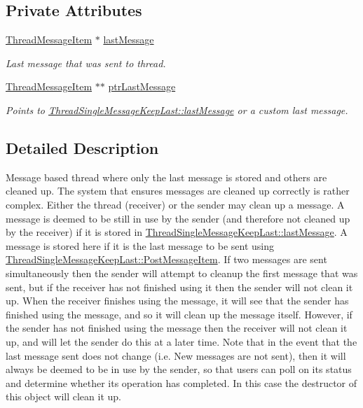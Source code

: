 \subsection*{Private Attributes}
\begin{DoxyCompactItemize}
\item 
\hyperlink{class_thread_message_item}{ThreadMessageItem} $\ast$ \hyperlink{class_thread_single_message_keep_last_ae36c3229c8538b56a7fc4740a5d58d4f}{lastMessage}
\begin{DoxyCompactList}\small\item\em Last message that was sent to thread. \item\end{DoxyCompactList}\item 
\hyperlink{class_thread_message_item}{ThreadMessageItem} $\ast$$\ast$ \hyperlink{class_thread_single_message_keep_last_a5a6db5f1ddd6002413c1424d87ff2152}{ptrLastMessage}
\begin{DoxyCompactList}\small\item\em Points to \hyperlink{class_thread_single_message_keep_last_ae36c3229c8538b56a7fc4740a5d58d4f}{ThreadSingleMessageKeepLast::lastMessage} or a custom last message. \item\end{DoxyCompactList}\end{DoxyCompactItemize}


\subsection{Detailed Description}
Message based thread where only the last message is stored and others are cleaned up. The system that ensures messages are cleaned up correctly is rather complex. Either the thread (receiver) or the sender may clean up a message. A message is deemed to be still in use by the sender (and therefore not cleaned up by the receiver) if it is stored in \hyperlink{class_thread_single_message_keep_last_ae36c3229c8538b56a7fc4740a5d58d4f}{ThreadSingleMessageKeepLast::lastMessage}. A message is stored here if it is the last message to be sent using \hyperlink{class_thread_single_message_keep_last_a27f81a79a325c68fb5257875e074924c}{ThreadSingleMessageKeepLast::PostMessageItem}. If two messages are sent simultaneously then the sender will attempt to cleanup the first message that was sent, but if the receiver has not finished using it then the sender will not clean it up. When the receiver finishes using the message, it will see that the sender has finished using the message, and so it will clean up the message itself. However, if the sender has not finished using the message then the receiver will not clean it up, and will let the sender do this at a later time. Note that in the event that the last message sent does not change (i.e. New messages are not sent), then it will always be deemed to be in use by the sender, so that users can poll on its status and determine whether its operation has completed. In this case the destructor of this object will clean it up.

